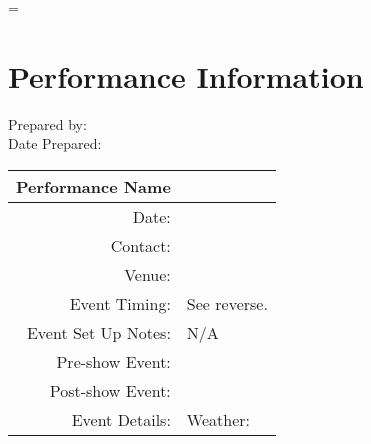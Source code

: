 \usepackage{hyperref}   %

\graphicspath{{./}}     %


\title{\myTitle}
\author{\myAuthor}
\date{\specialdate\today}

\pagestyle{fancy}
\renewcommand{\headrulewidth}{0pt} %
\fancyhead[]{ }
\fancyfoot{ }

\emergencystretch=\maxdimen
{}

\thispagestyle{fancy}	%
\hypersetup{linkcolor=blue} %
\flushleft
{} %

\section{Performance Information}
Prepared by: \myAuthor{} \\
Date Prepared: \todo{}

\begin{table}[h]
	\begin{tabular}{|r|l|}
		\hline Performance Name & \showName{} \\
		\hline Date: & \showDate{} \\
		\hline Contact: & \showContact{} \\
		\hline Venue: & \showVenue{} \\
		\hline Event Timing: & See reverse. \\
		\hline Event Set Up Notes: & N/A \\
		\hline Pre-show Event: & \showPreEvent{} \\
		\hline Post-show Event: & \showPostEvent{} \\
		\hline Event Details: & Weather: \weather{} \\
		\hline
	\end{tabular}
\end{table}

